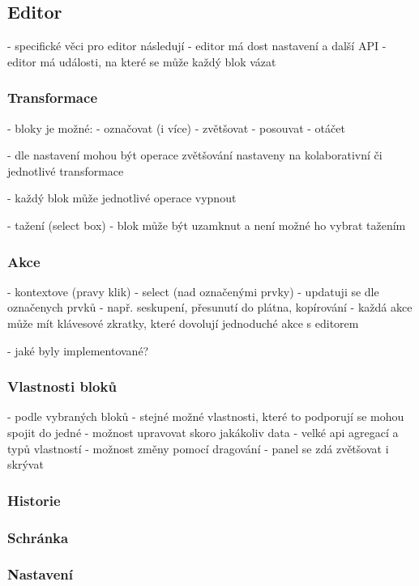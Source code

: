 \subsection{Editor}

- specifické věci pro editor následují
- editor má dost nastavení a další API
- editor má události, na které se může každý blok vázat

\subsubsection{Transformace}

- bloky je možné:
  - označovat (i více)
  - zvětšovat
  - posouvat
  - otáčet

- dle nastavení mohou být operace zvětšování nastaveny na kolaborativní či jednotlivé transformace

- každý blok může jednotlivé operace vypnout

- tažení (select box)
- blok může být uzamknut a není možné ho vybrat tažením

\subsubsection{Akce}

- kontextove (pravy klik)
- select (nad označenými prvky)
- updatuji se dle označenych prvků
- např. seskupení, přesunutí do plátna, kopírování
- každá akce může mít klávesové zkratky, které dovolují jednoduché akce s editorem

- jaké byly implementované?

\subsubsection{Vlastnosti bloků}

- podle vybraných bloků
- stejné možné vlastnosti, které to podporují se mohou spojit do jedné
- možnost upravovat skoro jakákoliv data
- velké api agregací a typů vlastností
- možnost změny pomocí dragování
- panel se zdá zvětšovat i skrývat

\subsubsection{Historie}
\subsubsection{Schránka}
\subsubsection{Nastavení}

